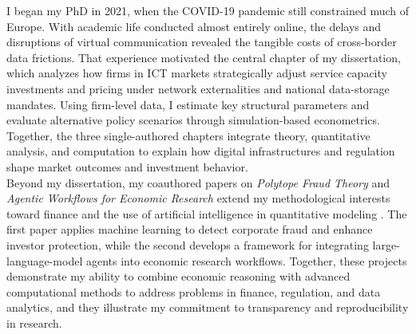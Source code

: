 \documentclass{nfr}
\begin{document}
I began my PhD in 2021, when the COVID-19 pandemic still constrained much of Europe. 
With academic life conducted almost entirely online, the delays and disruptions of virtual communication revealed the tangible costs of cross-border data frictions. 
That experience motivated the central chapter of my dissertation, which analyzes how firms in ICT markets strategically adjust service capacity investments and pricing under network externalities and national data-storage mandates. 
Using firm-level data, I estimate key structural parameters and evaluate alternative policy scenarios through simulation-based econometrics. 
Together, the three single-authored chapters integrate theory, quantitative analysis, and computation to explain how digital infrastructures and regulation shape market outcomes and investment behavior.\\

Beyond my dissertation, my coauthored papers on \textit{Polytope Fraud Theory} and \textit{Agentic Workflows for Economic Research} extend my methodological interests toward finance and the use of artificial intelligence in quantitative modeling \citep{Zhao2025, Dawid2025}. 
The first paper applies machine learning to detect corporate fraud and enhance investor protection, while the second develops a framework for integrating large-language-model agents into economic research workflows. 
Together, these projects demonstrate my ability to combine economic reasoning with advanced computational methods to address problems in finance, regulation, and data analytics, and they illustrate my commitment to transparency and reproducibility in research.\\
\end{document}
